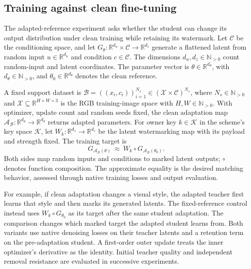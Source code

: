 \subsection{Training against clean fine-tuning}
\label{app:transport}
The adapted-reference experiment asks whether the student can change its output distribution under clean training while retaining its watermark. Let $\mathcal C$ be the conditioning space, and let $G_\theta:\mathbb R^{d_u}\times\mathcal C\to\mathbb R^{d_z}$ generate a flattened latent from random input $u\in\mathbb R^{d_u}$ and condition $c\in\mathcal C$. The dimensions $d_u,d_z\in\mathbb N_{>0}$ count random-input and latent coordinates. The parameter vector is $\theta\in\mathbb R^{d_\theta}$, with $d_\theta\in\mathbb N_{>0}$, and $\theta_0\in\mathbb R^{d_\theta}$ denotes the clean reference.

A fixed support dataset is $\mathcal B=((x_i,c_i))_{i=1}^{N_s}\in(\mathcal X\times\mathcal C)^{N_s}$, where $N_s\in\mathbb N_{>0}$ and $\mathcal X\subseteq\mathbb R^{H\times W\times3}$ is the RGB training-image space with $H,W\in\mathbb N_{>0}$. With optimizer, update count and random seeds fixed, the clean adaptation map $\mathcal A_{\mathcal B}:\mathbb R^{d_\theta}\to\mathbb R^{d_\theta}$ returns adapted parameters. For owner key $k\in\mathcal K$ in the scheme's key space $\mathcal K$, let $W_k:\mathbb R^{d_z}\to\mathbb R^{d_z}$ be the latent watermarking map with its payload and strength fixed. The training target is
\begin{equation}
\label{eq:adapted-reference-target}
 G_{\mathcal A_{\mathcal B}(\theta)}
 \ \approx\ W_k\circ G_{\mathcal A_{\mathcal B}(\theta_0)}.
\end{equation}
Both sides map random inputs and conditions to marked latent outputs; $\circ$ denotes function composition. The approximate equality is the desired matching behavior, assessed through native training losses and output evaluation.

For example, if clean adaptation changes a visual style, the adapted teacher first learns that style and then marks its generated latents. The fixed-reference control instead uses $W_k\circ G_{\theta_0}$ as its target after the same student adaptation. The comparison changes which marked target the adapted student learns from. Both variants use native denoising losses on their teacher latents and a retention term on the pre-adaptation student. A first-order outer update treats the inner optimizer's derivative as the identity. Initial teacher quality and independent removal resistance are evaluated in successive experiments.

